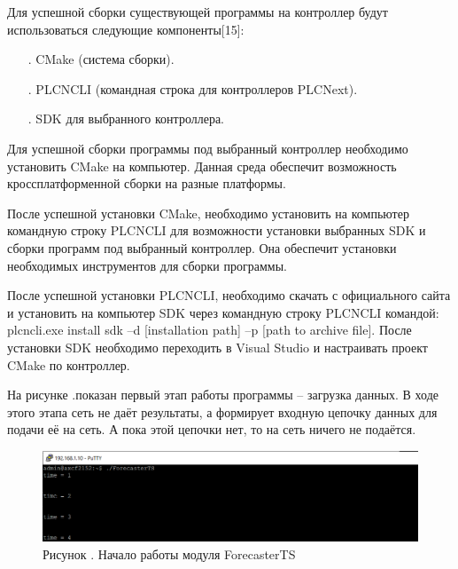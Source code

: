 \subtitlespace

{\gostFont

	\par \redline Для успешной сборки существующей программы на контроллер будут использоваться следующие компоненты[15]:

	\begin{itemize}[leftmargin=2.15cm, labelwidth=0.65cm, labelsep=0.0cm] 

		\item[\theitemcntr. ] CMake (система сборки).
		\addtocounter{itemcntr}{1}

		\item[\theitemcntr. ] PLCNCLI (командная строка для контроллеров PLCNext).
        \addtocounter{itemcntr}{1}

		\item[\theitemcntr. ] SDK для выбранного контроллера.
        \addtocounter{itemcntr}{1}		

		\setcounter{itemcntr}{1}
	\end{itemize}

	\par \redline Для успешной сборки программы под выбранный контроллер необходимо установить CMake на компьютер. Данная среда обеспечит возможность кроссплатформенной сборки на разные платформы.

	\par \redline После успешной установки CMake, необходимо установить на компьютер командную строку PLCNCLI для возможности установки выбранных SDK и сборки программ под выбранный контроллер. Она обеспечит установки необходимых инструментов для сборки программы.

	\par \redline После успешной установки PLCNCLI, необходимо скачать с официального сайта и установить на компьютер SDK через командную строку PLCNCLI командой: plcncli.exe install sdk –d [installation path] –p [path to archive file].  После установки SDK необходимо переходить в Visual Studio и настраивать проект CMake по контроллер.
	\par \redline На рисунке \thechaptercntr .\theimagecntr \spc показан первый этап работы программы {--} загрузка данных. В ходе этого этапа сеть не даёт результаты, а формирует входную цепочку данных для подачи её на сеть. А пока этой цепочки нет, то на сеть ничего не подаётся. 

	\begin{figure}[H]
		\centering
		\def\svgwidth{\textwidth}
		\includegraphics[width=\textwidth]{images/ResultsDumping.png}
		\caption*{\gostFont Рисунок \thechaptercntr .\theimagecntr \spc {--} Начало работы модуля ForecasterTS}
		\label{fig:ResultsDumping}
	  \end{figure} \addtocounter{imagecntr}{1}

}
